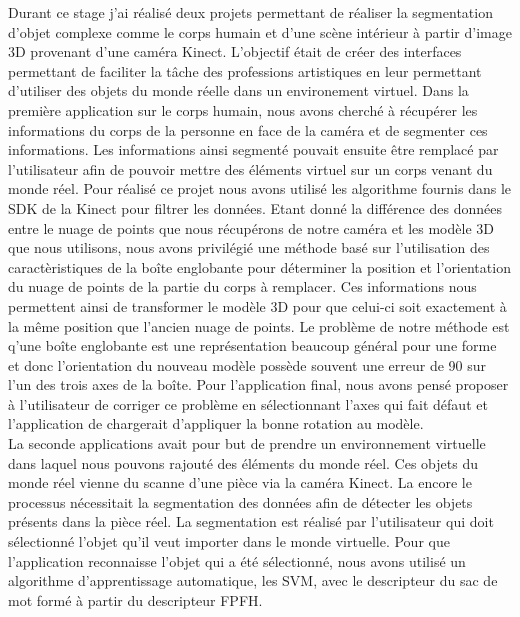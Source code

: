 Durant ce stage j'ai réalisé deux projets permettant de réaliser la segmentation d'objet complexe comme le corps
humain et d'une scène intérieur à partir d'image 3D provenant d'une caméra Kinect. L'objectif était de créer
des interfaces permettant de faciliter la tâche des professions artistiques en leur permettant d'utiliser 
des objets du monde réelle dans un environement virtuel. Dans la première application sur le corps humain,
nous avons cherché à récupérer les informations du corps de la personne en face de la caméra et de segmenter
ces informations. Les informations ainsi segmenté pouvait ensuite être remplacé par l'utilisateur afin de 
pouvoir mettre des éléments virtuel sur un corps venant du monde réel. Pour réalisé ce projet nous avons 
utilisé les algorithme fournis dans le SDK de la Kinect pour filtrer les données. Etant donné la différence
des données entre le nuage de points que nous récupérons de notre caméra et les modèle 3D que nous utilisons,
nous avons privilégié une méthode basé sur l'utilisation des caractèristiques de la boîte englobante pour
déterminer la position et l'orientation du nuage de points de la partie du corps à remplacer. Ces informations
nous permettent ainsi de transformer le modèle 3D pour que celui-ci soit exactement à la même position que
l'ancien nuage de points. Le problème de notre méthode est q'une boîte englobante est une représentation 
beaucoup général pour une forme et donc l'orientation du nouveau modèle possède souvent une erreur de 90\degre
sur l'un des trois axes de la boîte. Pour l'application final, nous avons pensé proposer à l'utilisateur de 
corriger ce problème en sélectionnant l'axes qui fait défaut et l'application de chargerait d'appliquer la
bonne rotation au modèle.\\

La seconde applications avait pour but de prendre un environnement virtuelle dans laquel nous pouvons rajouté des éléments 
du monde réel. Ces objets du monde réel vienne du scanne d'une pièce via la caméra Kinect. La encore le processus nécessitait 
la segmentation des données afin de détecter les objets présents dans la pièce réel. La segmentation est réalisé 
par l'utilisateur qui doit sélectionné l'objet qu'il veut importer dans le monde virtuelle. Pour que l'application
reconnaisse l'objet qui a été sélectionné, nous avons utilisé un algorithme d'apprentissage automatique, les SVM,
avec le descripteur du sac de mot formé à partir du descripteur FPFH.\\

